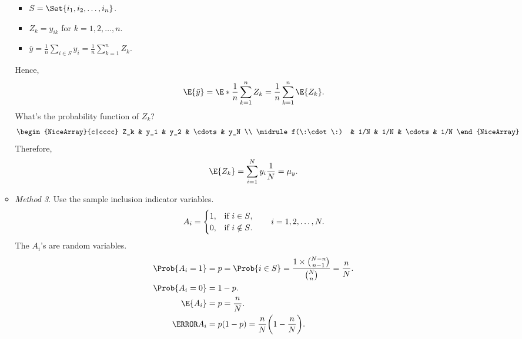 \documentclass[oneside]{book}\usepackage[]{graphicx}\usepackage[svgnames]{xcolor}
\begin{document}
\begin{Result}{}
\begin{enumerate}[(a)]
\begin{itemize}
                              \begin{itemize}
                                    \item $ S=\Set{i_1,i_2,\ldots,i_n} $.
                                    \item $ Z_k=y_{ik} $ for $k=1,2,\ldots,n$.
                                    \item $ \bar{y}=\frac{1}{n}\sum_{i\in S}y_i=\frac{1}{n}\sum_{k=1}^{n}Z_k $.
                              \end{itemize}
                              Hence,
                              \[ \E{\bar{y}}=\E*{\frac{1}{n}\sum_{k=1}^n Z_k}
                                    =\frac{1}{n}\sum_{k=1}^{n}\E{Z_k}. \]
                              What's the probability function of $ Z_k $?
                              \[ \begin{NiceArray}{c|cccc}
                                          Z_k          & y_1 & y_2 & \cdots & y_N \\
                                          \midrule
                                          f(\:\cdot\:) & 1/N & 1/N & \cdots & 1/N
                                    \end{NiceArray} \]
                              Therefore,
                              \[ \E{Z_k}=\sum_{i=1}^{N}y_i \frac{1}{N}=\mu_y. \]
                        \item \emph{Method 3}. Use the sample inclusion indicator variables.
                              \[ A_i=\begin{cases}
                                          1, & \text{if $ i\in S $},    \\
                                          0, & \text{if $ i\notin S $}.
                                    \end{cases}\qquad i=1,2,\ldots,N. \]
                              The $ A_i $'s are random variables.
                              \begin{align*}
                                    \Prob{A_i=1} & =p=\Prob{i\in S}=\frac{1\times \binom{N-n}{n-1}}{\binom{N}{n}}=\frac{n}{N}. \\
                                    \Prob{A_i=0} & =1-p.                                                                       \\
                                    \E{A_i}      & =p=\frac{n}{N}.                                                             \\
                                    \V{A_i}      & =p(1-p)=\frac{n}{N}\biggl(1-\frac{n}{N}\biggr).                             \\

\end{align*}
\end{itemize}
\end{enumerate}
\end{Result}
\end{document}
